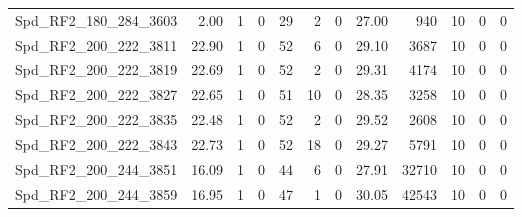 \begin{longtable}[c]{@{}lrrrrrrrrrrr@{}}
Spd\_RF2\_180\_284\_3603     & 2.00                   & 1                       & 0                       & 29                     & 2                       & 0                       & 27.00                   & 940                      & 10                       & 0                        & 0                        \\
Spd\_RF2\_200\_222\_3811     & 22.90                  & 1                       & 0                       & 52                     & 6                       & 0                       & 29.10                   & 3687                     & 10                       & 0                        & 0                        \\
Spd\_RF2\_200\_222\_3819     & 22.69                  & 1                       & 0                       & 52                     & 2                       & 0                       & 29.31                   & 4174                     & 10                       & 0                        & 0                        \\
Spd\_RF2\_200\_222\_3827     & 22.65                  & 1                       & 0                       & 51                     & 10                      & 0                       & 28.35                   & 3258                     & 10                       & 0                        & 0                        \\
Spd\_RF2\_200\_222\_3835     & 22.48                  & 1                       & 0                       & 52                     & 2                       & 0                       & 29.52                   & 2608                     & 10                       & 0                        & 0                        \\
Spd\_RF2\_200\_222\_3843     & 22.73                  & 1                       & 0                       & 52                     & 18                      & 0                       & 29.27                   & 5791                     & 10                       & 0                        & 0                        \\
Spd\_RF2\_200\_244\_3851     & 16.09                  & 1                       & 0                       & 44                     & 6                       & 0                       & 27.91                   & 32710                    & 10                       & 0                        & 0                        \\
Spd\_RF2\_200\_244\_3859     & 16.95                  & 1                       & 0                       & 47                     & 1                       & 0                       & 30.05                   & 42543                    & 10                       & 0                        & 0                        \\

\end{longtable}
